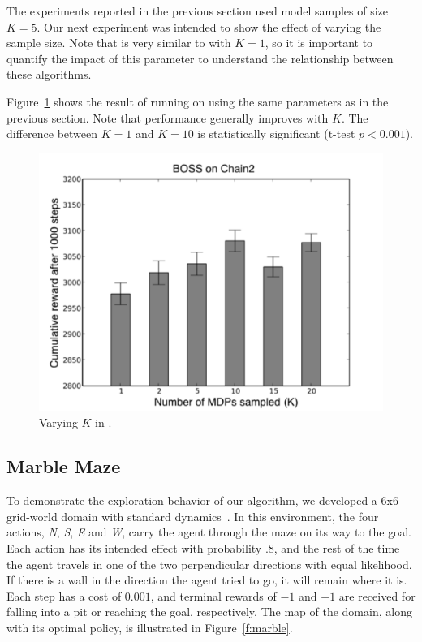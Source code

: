 The experiments reported in the previous section used model samples of
size $K=5$.  Our next experiment was intended to show the effect of varying the
sample size.  Note that  is very similar to  with $K=1$,
so it is important to quantify the impact of this parameter to
understand the relationship between these algorithms.

Figure~\ref{f:varyk} shows the result of running  on  using
the same parameters as in the previous section.  Note that performance
generally improves with $K$.  The difference between $K=1$ and $K=10$ is
statistically significant (t-test $p<0.001$).

\begin{figure}[t]
\begin{center}
\includegraphics[width=1.0\linewidth]{varyk}
\caption{Varying $K$ in .}
\label{f:varyk}
\end{center}
\end{figure}


\subsection{Marble Maze}


To demonstrate the exploration behavior of our algorithm, we developed a
6x6 grid-world domain with standard dynamics~\cite{russell94}.  In this environment, the four actions,
\emph{N}, \emph{S}, \emph{E} and \emph{W}, carry the
agent through the maze on its way to the goal.  Each action has its
intended effect with probability .8, and the rest of the time the
agent travels in one of the two perpendicular directions with
equal likelihood.  If there is a wall in the direction the agent tried
to go, it will remain where it is.  Each step has a cost of $0.001$, and
terminal rewards of $-1$ and $+1$ are received for falling into a pit or
reaching the goal, respectively.  The map of the domain, along with
its optimal policy, is illustrated in Figure~\ref{f:marble}.

